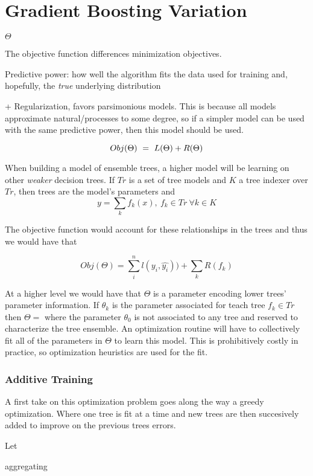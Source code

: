 \section{Gradient Boosting Variation}


$\Theta$

The objective function differences minimization objectives. 

Predictive power: how well the algorithm fits the data used for training and, hopefully, the \textit{true} underlying distribution

+ Regularization, favors parsimonious models. This is because all models approximate natural/processes to some degree, so if a simpler model can be used with the same predictive power, then this model should be used.  

\begin{equation} \label{eq:objFunction}
Obj(\Theta) \ = \ L(\Theta) + R(\Theta)
\\
\end{equation}

When building a model of ensemble trees, a higher model will be learning on other \textit{weaker} decision trees. If $Tr$ is a set of tree models and $K$ a tree indexer over $Tr$, then trees are the model's parameters and
\[ y = \sum_k f_k(x) , \ f_k \in Tr \ \forall k \in K \]
 
The objective function would account for these relationships in the trees and thus we would have that
 
\[ Obj(\Theta) = \sum_i^n l(y_i,\hat{y_i}))  +  \sum_k R(f_k) \] 
%    

At a higher level we would have that $\Theta$ is a parameter encoding lower trees' parameter information. If $\theta_k$ is the parameter associated for teach tree $f_k \in Tr$ then $\Theta = {}$ where the parameter $\theta_0$ is not associated to any tree and reserved to characterize the tree ensemble. An optimization routine will have to collectively fit all of the parameters in $\Theta$ to learn this model. This is prohibitively costly in practice, so optimization heuristics are used for the fit. 

\subsubsection{Additive Training}

A first take on this optimization problem goes along the way a greedy optimization. Where one tree is fit at a time and new trees are then succesively added to improve on the previous trees errors. 

Let 

aggregating 



